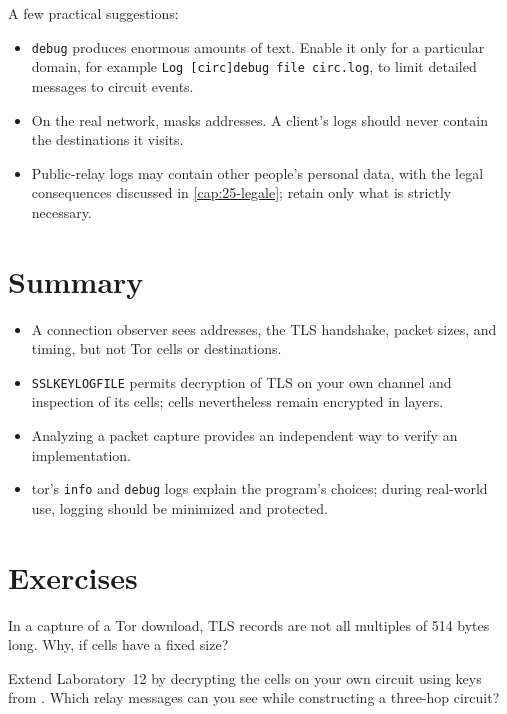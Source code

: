 A few practical suggestions:
\begin{itemize}
  \item \texttt{debug} produces enormous amounts of text. Enable it only for a particular domain, for example \texttt{Log [circ]debug file circ.log}, to limit detailed messages to circuit events.
  \item On the real network,  masks addresses. A client's logs should never contain the destinations it visits.
  \item Public-relay logs may contain other people's personal data, with the legal consequences discussed in \cref{cap:25-legale}; retain only what is strictly necessary.
\end{itemize}

\section*{Summary}
\begin{itemize}
  \item A connection observer sees addresses, the TLS handshake, packet sizes, and timing, but not Tor cells or destinations.
  \item \texttt{SSLKEYLOGFILE} permits decryption of TLS on your own channel and inspection of its cells;  cells nevertheless remain encrypted in layers.
  \item Analyzing a packet capture provides an independent way to verify an implementation.
  \item tor's \texttt{info} and \texttt{debug} logs explain the program's choices; during real-world use, logging should be minimized and protected.
\end{itemize}

\section*{Exercises}

\begin{esercizio}[1]\label{es:20-dimensioni}
In a capture of a Tor download, TLS records are not all multiples of 514 bytes long. Why, if cells have a fixed size?
\end{esercizio}

\begin{esercizio}[2]\label{es:20-relay}
Extend Laboratory~12 by decrypting the  cells on your own circuit using keys from . Which relay messages can you see while constructing a three-hop circuit?
\end{esercizio}

